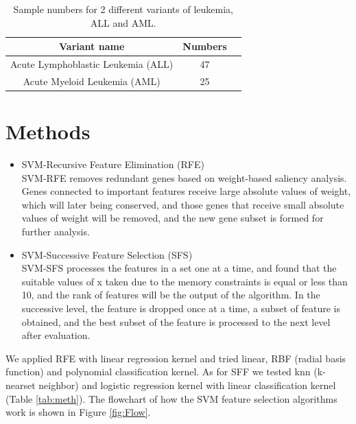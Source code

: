 \documentclass[a4paper,twocolumn]{article} %
\begin{document}
		\begin{table}[h]
		\caption{Sample numbers for 2 different variants of leukemia, ALL and AML.}\label{tab:tvar}
		\begin{tabular}{ ccc } %
			\hline
			Variant name &  Numbers\\
			\hline
			Acute Lymphoblastic Leukemia (ALL) & 47\\
			Acute Myeloid Leukemia (AML) & 25\\
			\hline
		\end{tabular}
	\end{table}
	
	\section*{Methods}
	\label{sec:meth}
	\begin{itemize}
		\item SVM-Recursive Feature Elimination (RFE)\\
		SVM-RFE removes redundant genes based on weight-based saliency analysis. Genes connected to important features receive large absolute values of weight, which will later being conserved, and those genes that receive small absolute values of weight will be removed, and the new gene subset is formed for further analysis.
		
		\item SVM-Successive Feature Selection (SFS)\\
		SVM-SFS processes the features in a set one at a time, and found that the suitable values of x taken due to the memory constraints is equal or less than 10, and the rank of features will be the output of the algorithm. In the successive level, the feature is dropped once at a time, a subset of feature is obtained, and the best subset of the feature is processed to the next level after evaluation.
		
	\end{itemize}
	
    We applied RFE with linear regression kernel and tried linear, RBF (radial basis function) and polynomial classification kernel. As for SFF we tested knn (k-nearset neighbor) and logistic regression kernel with linear classification kernel (Table \ref{tab:meth}). The flowchart of how the SVM feature selection algorithms work is shown in Figure \ref{fig:Flow}.\newline
    
\end{document}
